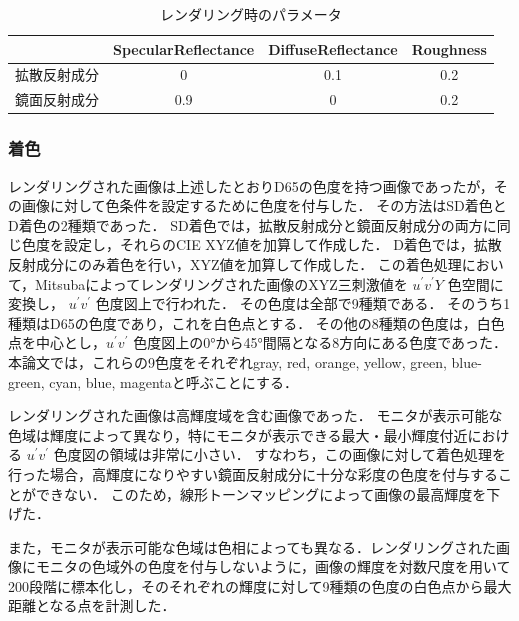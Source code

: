             \begin{table}[h]
                \centering
                \caption{レンダリング時のパラメータ}
                \begin{tabular}{|l||c|c|c|} \hline
                                           & SpecularReflectance & DiffuseReflectance & Roughness \\ \hline \hline
                    拡散反射成分           & 0                   & 0.1                & 0.2 \\ \hline
                    鏡面反射成分           & 0.9                 & 0                  & 0.2 \\ \hline
                \end{tabular}
            \end{table}
        
        \subsubsection{着色}

            レンダリングされた画像は上述したとおりD65の色度を持つ画像であったが，その画像に対して色条件を設定するために色度を付与した．
            その方法はSD着色とD着色の2種類であった．
            SD着色では，拡散反射成分と鏡面反射成分の両方に同じ色度を設定し，それらのCIE XYZ値を加算して作成した．
            D着色では，拡散反射成分にのみ着色を行い，XYZ値を加算して作成した．
            この着色処理において，Mitsubaによってレンダリングされた画像のXYZ三刺激値を $u^{\prime}v^{\prime}Y$ 色空間に変換し， $u^{\prime}v^{\prime}$ 色度図上で行われた．
            その色度は全部で9種類である．
            そのうち1種類はD65の色度であり，これを白色点とする．
            その他の8種類の色度は，白色点を中心とし，$u^{\prime}v^{\prime}$ 色度図上の0°から45°間隔となる8方向にある色度であった．
            本論文では，これらの9色度をそれぞれgray, red, orange, yellow, green, blue-green, cyan, blue, magentaと呼ぶことにする．

            レンダリングされた画像は高輝度域を含む画像であった．
            モニタが表示可能な色域は輝度によって異なり，特にモニタが表示できる最大・最小輝度付近における $u^{\prime}v^{\prime}$ 色度図の領域は非常に小さい．
            すなわち，この画像に対して着色処理を行った場合，高輝度になりやすい鏡面反射成分に十分な彩度の色度を付与することができない．
            このため，線形トーンマッピングによって画像の最高輝度を下げた．

            また，モニタが表示可能な色域は色相によっても異なる．レンダリングされた画像にモニタの色域外の色度を付与しないように，画像の輝度を対数尺度を用いて200段階に標本化し，そのそれぞれの輝度に対して9種類の色度の白色点から最大距離となる点を計測した．


